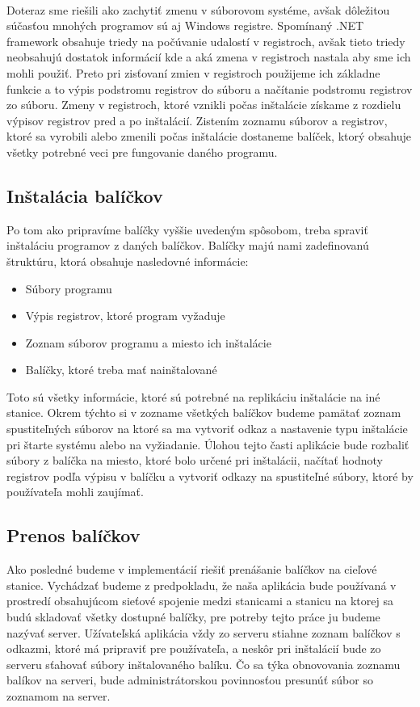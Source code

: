\paragraph{}
Doteraz sme riešili ako zachytiť zmenu v súborovom systéme, avšak dôležitou súčasťou mnohých programov sú aj Windows registre. Spomínaný .NET framework obsahuje triedy na počúvanie udalostí v registroch, avšak tieto triedy neobsahujú dostatok informácií kde a aká zmena v registroch nastala aby sme ich mohli použiť. Preto pri zisťovaní zmien v registroch použijeme ich základne funkcie a to výpis podstromu  registrov do súboru a načítanie podstromu registrov zo súboru. Zmeny v registroch, ktoré vznikli počas inštalácie získame z rozdielu výpisov registrov pred a po inštalácií. Zistením zoznamu súborov a registrov, ktoré sa vyrobili alebo zmenili počas inštalácie dostaneme balíček, ktorý obsahuje všetky potrebné veci pre fungovanie daného programu.

\subsection{Inštalácia balíčkov}
Po tom ako pripravíme balíčky vyššie uvedeným spôsobom, treba spraviť inštaláciu programov z daných balíčkov. Balíčky majú nami zadefinovanú štruktúru, ktorá obsahuje nasledovné informácie:

\begin{itemize}
\item Súbory programu
\item Výpis registrov, ktoré program vyžaduje
\item Zoznam súborov programu a miesto ich inštalácie
\item Balíčky, ktoré treba mať nainštalované
\end{itemize}

Toto sú všetky informácie, ktoré sú potrebné na replikáciu inštalácie na iné stanice. Okrem týchto si v zozname všetkých balíčkov budeme pamätať zoznam spustiteľných súborov na ktoré sa ma vytvoriť odkaz a nastavenie typu inštalácie pri štarte systému alebo na vyžiadanie. Úlohou tejto časti aplikácie bude rozbaliť súbory z balíčka na miesto, ktoré bolo určené pri inštalácii, načítať hodnoty registrov podľa výpisu v balíčku a vytvoriť odkazy na spustiteľné súbory, ktoré by používateľa mohli zaujímať.

\subsection{Prenos balíčkov}
Ako posledné budeme v implementácií riešiť prenášanie balíčkov na cieľové stanice. Vychádzať budeme z predpokladu, že naša aplikácia bude používaná v prostredí obsahujúcom sieťové spojenie medzi stanicami a stanicu na ktorej sa budú skladovať všetky dostupné balíčky, pre potreby tejto práce ju budeme nazývať server. Užívateľská aplikácia vždy zo serveru stiahne zoznam balíčkov s odkazmi, ktoré má pripraviť pre používateľa, a neskôr pri inštalácií bude zo serveru sťahovať súbory inštalovaného balíku. Čo sa týka obnovovania zoznamu balíkov na serveri, bude administrátorskou povinnosťou presunúť súbor so zoznamom na server.

